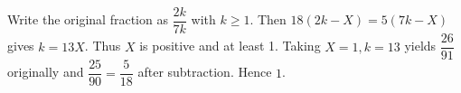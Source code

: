 Write the original fraction as $\dfrac{2k}{7k}$ with $k\ge1$. Then $18(2k-X)=5(7k-X)$ gives $k=13X$. Thus $X$ is positive and at least 1. Taking $X=1,k=13$ yields $\dfrac{26}{91}$ originally and $\dfrac{25}{90}=\dfrac{5}{18}$ after subtraction. Hence $\boxed1$.
